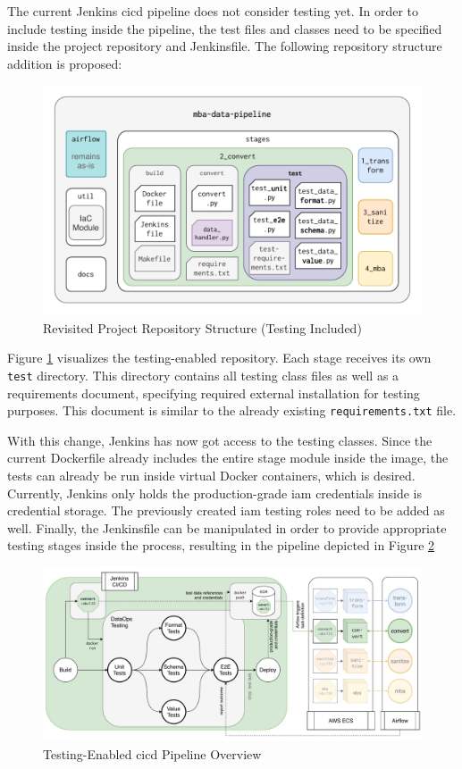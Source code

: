 The current Jenkins \ac{cicd} pipeline does not consider testing yet. In order to include testing inside the pipeline, the test files and classes need to be specified inside the project repository and Jenkinsfile. The following repository structure addition is proposed:

\begin{figure}[h!]
	\centering
	\includegraphics[width=\linewidth]{main-matter/img/5-repo-structure-new}
	\caption{Revisited Project Repository Structure (Testing Included)}
	\label{fig:5-new-repo}
\end{figure}

Figure \ref{fig:5-new-repo} visualizes the testing-enabled repository. Each stage receives its own \texttt{test} directory. This directory contains all testing class files as well as a requirements document, specifying required external installation for testing purposes. This document is similar to the already existing \texttt{requirements.txt} file.

With this change, Jenkins has now got access to the testing classes. Since the current Dockerfile already includes the entire stage module inside the image, the tests can already be run inside virtual Docker containers, which is desired. Currently, Jenkins only holds the production-grade \ac{iam} credentials inside is credential storage. The previously created \ac{iam} testing roles need to be added as well. Finally, the Jenkinsfile can be manipulated in order to provide appropriate testing stages inside the process, resulting in the pipeline depicted in Figure \ref{fig:5-cicd-testing}

\begin{figure}[h!]
	\centering
	\includegraphics[width=\linewidth]{main-matter/img/5-cicd-testing.pdf}
	\caption{Testing-Enabled \ac{cicd} Pipeline Overview}
	\label{fig:5-cicd-testing}
\end{figure}

